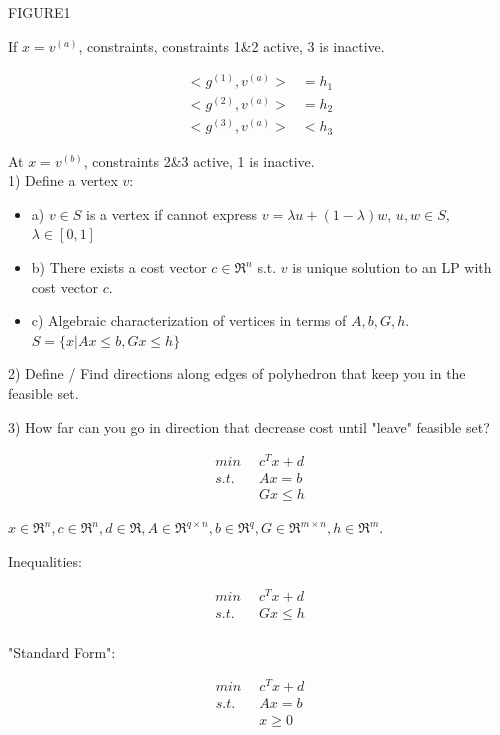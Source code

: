 FIGURE1


If $x =v^{(a)}$, constraints, constraints 1\&2 active, 3 is inactive.

\begin{align*}
<g^{(1)}, v^{(a)}> &= h_1\\
<g^{(2)}, v^{(a)}> &= h_2\\
<g^{(3)}, v^{(a)}> &< h_3
\end{align*}

At $x = v^{(b)}$, constraints 2\&3 active, 1 is inactive.\\

1) Define a vertex $v$:

\begin{itemize}
	\item a) $v\in S$ is a vertex if cannot express $v = \lambda u +(1-\lambda)w$, $u, w\in S$, $\lambda \in [0,1]$
	
	\item b) There exists a cost vector $c\in \Re^n$ s.t. $v$ is unique solution to an LP with cost vector $c$.
	
	\item c) Algebraic characterization of vertices in terms of $A, b, G, h$. $S = \{x|Ax \leq b, Gx\leq h \}$
\end{itemize}



2) Define / Find directions along edges of polyhedron that keep you in the feasible set.

3) How far can you go in direction that decrease cost until "leave" feasible set?

\begin{align*}
min \,\,\, &c^Tx+d\\
s.t. \,\,\, &Ax = b\\
&Gx\leq h
\end{align*}

$x\in \Re^n, c\in \Re^n, d\in \Re, A\in \Re^{q\times n}, b\in \Re^q, G\in \Re^{m\times n}, h\in \Re^m$.

Inequalities:

\begin{align*}
min \,\,\, &c^Tx+d\\
s.t. \,\,\, &Gx\leq h\\
\end{align*}

"Standard Form":

\begin{align*}
min \,\,\, &c^Tx+d\\
s.t. \,\,\, &Ax = b\\
&x\geq 0
\end{align*}

